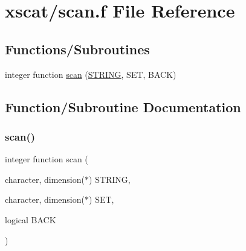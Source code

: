 \hypertarget{scan_8f}{}\section{xscat/scan.f File Reference}
\label{scan_8f}
\subsection*{Functions/\+Subroutines}
\begin{DoxyCompactItemize}
\item 
integer function \hyperlink{scan_8f_a703f86e493aaaf6783a89ec697c667e6}{scan} (\hyperlink{eval__tab_8h_a0f4d394a3ab4e09bff60f714c66dc5ee}{S\+T\+R\+I\+NG}, S\+ET, B\+A\+CK)
\end{DoxyCompactItemize}


\subsection{Function/\+Subroutine Documentation}
\mbox{\label{scan_8f_a703f86e493aaaf6783a89ec697c667e6}} 
\subsubsection{\texorpdfstring{scan()}{scan()}}
{\footnotesize\ttfamily integer function scan (\begin{DoxyParamCaption}\item[{character, dimension($\ast$)}]{S\+T\+R\+I\+NG,  }\item[{character, dimension($\ast$)}]{S\+ET,  }\item[{logical}]{B\+A\+CK }\end{DoxyParamCaption})}

